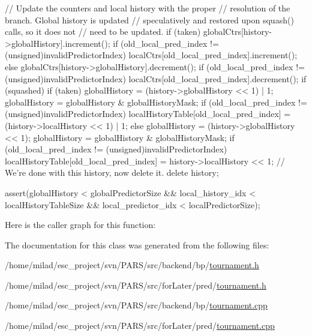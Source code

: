 \begin{DoxyCode}
{{{             // Update the counters and local history with the proper
             // resolution of the branch.  Global history is updated
             // speculatively and restored upon squash() calls, so it does not
             // need to be updated.
             if (taken) {
                  globalCtrs[history->globalHistory].increment();
                  if (old_local_pred_index != (unsigned)invalidPredictorIndex) {
                          localCtrs[old_local_pred_index].increment();
                  }
             } else {
                  globalCtrs[history->globalHistory].decrement();
                  if (old_local_pred_index != (unsigned)invalidPredictorIndex) {
                          localCtrs[old_local_pred_index].decrement();
                  }
             }
        }
        if (squashed) {
             if (taken) {
                globalHistory = (history->globalHistory << 1) | 1;
                globalHistory = globalHistory & globalHistoryMask;
                if (old_local_pred_index != (unsigned)invalidPredictorIndex) {
                    localHistoryTable[old_local_pred_index] =
                     (history->localHistory << 1) | 1;
                }
             } else {
                globalHistory = (history->globalHistory << 1);
                globalHistory = globalHistory & globalHistoryMask;
                if (old_local_pred_index != (unsigned)invalidPredictorIndex) {
                     localHistoryTable[old_local_pred_index] =
                     history->localHistory << 1;
                }
             }
        }
        // We're done with this history, now delete it.
        delete history;

    }

    assert(globalHistory < globalPredictorSize &&
           local_history_idx < localHistoryTableSize &&
           local_predictor_idx < localPredictorSize);


}
\end{DoxyCode}


Here is the caller graph for this function:




The documentation for this class was generated from the following files:\begin{DoxyCompactItemize}
\item 
/home/milad/esc\_\-project/svn/PARS/src/backend/bp/\hyperlink{backend_2bp_2tournament_8h}{tournament.h}\item 
/home/milad/esc\_\-project/svn/PARS/src/forLater/pred/\hyperlink{forLater_2pred_2tournament_8h}{tournament.h}\item 
/home/milad/esc\_\-project/svn/PARS/src/backend/bp/\hyperlink{backend_2bp_2tournament_8cpp}{tournament.cpp}\item 
/home/milad/esc\_\-project/svn/PARS/src/forLater/pred/\hyperlink{forLater_2pred_2tournament_8cpp}{tournament.cpp}\end{DoxyCompactItemize}
